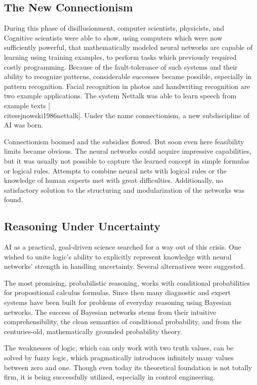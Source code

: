 \documentclass[10pt]{book}
\begin{document}
\subsection{The New Connectionism}
During this phase of disillusionment, computer scientists, physicists, and Cognitive scientists were able to show, using computers which were now sufficiently powerful, that mathematically modeled neural networks are capable of learning using training examples, to perform tasks which previously required costly programming. Because of the fault-tolerance of such systems and their ability to recognize patterns, considerable successes became possible, especially in pattern recognition. Facial recognition in photos and handwriting recognition are two example applications. The system Nettalk was able to learn speech from example texts [\\cite{sejnowski1986nettalk}]. Under the name connectionism, a new subdiscipline of AI was born.

Connectionism boomed and the subsidies flowed. But soon even here feasibility limits became obvious. The neural networks could acquire impressive capabilities, but it was usually not possible to capture the learned concept in simple formulas or logical rules. Attempts to combine neural nets with logical rules or the knowledge of human experts met with great difficulties. Additionally, no satisfactory solution to the structuring and modularization of the networks was found.

\subsection{Reasoning Under Uncertainty}
AI as a practical, goal-driven science searched for a way out of this crisis. One wished to unite logic's ability to explicitly represent knowledge with neural networks' strength in handling uncertainty. Several alternatives were suggested.

The most promising, probabilistic reasoning, works with conditional probabilities for propositional calculus formulas. Since then many diagnostic and expert systems have been built for problems of everyday reasoning using Bayesian\\
networks. The success of Bayesian networks stems from their intuitive comprehensibility, the clean semantics of conditional probability, and from the centuries-old, mathematically grounded probability theory.


The weaknesses of logic, which can only work with two truth values, can be solved by fuzzy logic, which pragmatically introduces infinitely many values between zero and one. Though even today its theoretical foundation is not totally firm, it is being successfully utilized, especially in control engineering.
\end{document}
